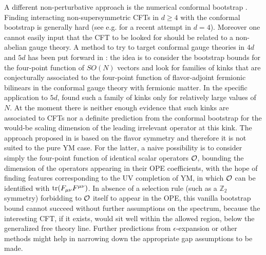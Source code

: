 \documentclass [11pt]{article}
\begin{document}
A different non-perturbative approach is the numerical conformal bootstrap \cite{Poland:2018epd}. Finding interacting non-supersymmetric CFTs in $d\geq 4$ with the conformal bootstrap is generally hard (see e.g. \cite{Karateev:2019pvw} for a recent attempt in $d=4$). Moreover one cannot easily input that the CFT to be looked for should be related to a non-abelian gauge theory. A method to try to target conformal gauge theories in $4d$ and $5d$ has been put forward in \cite{Li:2020bnb}: the idea is to consider the bootstrap bounds for the four-point function of $SO(N)$ vectors and look for families of kinks that are conjecturally associated to the four-point function of flavor-adjoint fermionic bilinears in the conformal gauge theory with fermionic matter.  In the specific application to $5d$, \cite{Poland:2018epd} found such a family of kinks only for relatively large values of $N$. At the moment there is neither enough evidence that such kinks are associated to CFTs 
nor a definite prediction from the conformal bootstrap for the would-be scaling dimension of the leading irrelevant operator at this kink. %
The approach proposed in \cite{Poland:2018epd} is based on the flavor symmetry and therefore it is not suited to the pure YM case. For the latter, a naive possibility is to consider simply the four-point function of identical scalar operators ${\cal O}$, bounding the dimension of the operators appearing in their OPE coefficients, with the hope of finding features corresponding to the UV completion of YM, in which ${\cal O}$ can be identified with ${\rm tr}( F_{\mu\nu}F^{\mu\nu})$. In absence of a selection rule (such as a $\mathbb{Z}_2$ symmetry) forbidding to ${\cal O}$ itself to appear in the OPE, this vanilla bootstrap bound cannot succeed without further assumptions on the spectrum, because the interesting CFT, if it exists, would sit well within the allowed region, below the generalized free theory line.  Further predictions from $\epsilon$-expansion or other methods might help in narrowing down the appropriate gap assumptions to be made.
\end{document}
